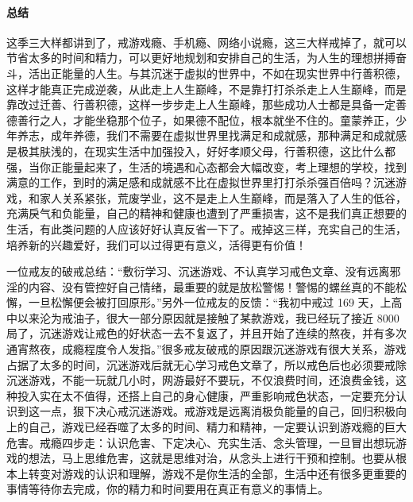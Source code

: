 \paragraph{总结}

这季三大样都讲到了，戒游戏瘾、手机瘾、网络小说瘾，这三大样戒掉了，就可以节省太多的时间和精力，可以更好地规划和安排自己的生活，为人生的理想拼搏奋斗，活出正能量的人生。与其沉迷于虚拟的世界中，不如在现实世界中行善积德，这样才能真正完成逆袭，从此走上人生巅峰，不是靠打打杀杀走上人生巅峰，而是靠改过迁善、行善积德，这样一步步走上人生巅峰，那些成功人士都是具备一定善德善行之人，才能坐稳那个位子，如果德不配位，根本就坐不住的。童蒙养正，少年养志，成年养德，我们不需要在虚拟世界里找满足和成就感，那种满足和成就感是极其肤浅的，在现实生活中加强投入，好好孝顺父母，行善积德，这比什么都强，当你正能量起来了，生活的境遇和心态都会大幅改变，考上理想的学校，找到满意的工作，到时的满足感和成就感不比在虚拟世界里打打杀杀强百倍吗？沉迷游戏，和家人关系紧张，荒废学业，这不是走上人生巅峰，而是落入了人生的低谷，充满戾气和负能量，自己的精神和健康也遭到了严重损害，这不是我们真正想要的生活，有此类问题的人应该好好认真反省一下了。戒掉这三样，充实自己的生活，培养新的兴趣爱好，我们可以过得更有意义，活得更有价值！

一位戒友的破戒总结：“敷衍学习、沉迷游戏、不认真学习戒色文章、没有远离邪淫的内容、没有管控好自己情绪，最重要的就是放松警惕！警惕的螺丝真的不能松懈，一旦松懈便会被打回原形。”另外一位戒友的反馈：“我初中戒过 169 天，上高中以来沦为戒油子，很大一部分原因就是接触了某款游戏，我已经玩了接近 8000 局了，沉迷游戏让戒色的好状态一去不复返了，并且开始了连续的熬夜，并有多次通宵熬夜，成瘾程度令人发指。”很多戒友破戒的原因跟沉迷游戏有很大关系，游戏占据了太多的时间，沉迷游戏后就无心学习戒色文章了，所以戒色后也必须要戒除沉迷游戏，不能一玩就几小时，网游最好不要玩，不仅浪费时间，还浪费金钱，这种投入实在太不值得，还搭上自己的身心健康，严重影响戒色状态，一定要充分认识到这一点，狠下决心戒沉迷游戏。戒游戏是远离消极负能量的自己，回归积极向上的自己，游戏已经吞噬了太多的时间、精力和精神，一定要认识到游戏瘾的巨大危害。戒瘾四步走：认识危害、下定决心、充实生活、念头管理，一旦冒出想玩游戏的想法，马上思维危害，这就是思维对治，从念头上进行干预和控制。也要从根本上转变对游戏的认识和理解，游戏不是你生活的全部，生活中还有很多更重要的事情等待你去完成，你的精力和时间要用在真正有意义的事情上。

